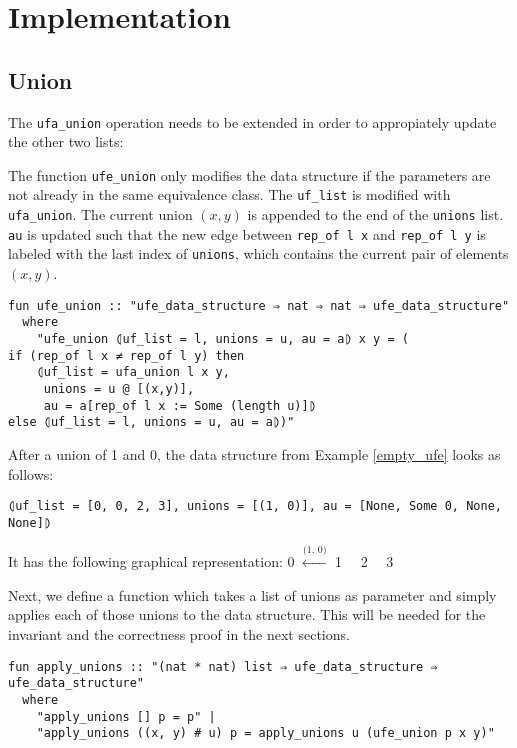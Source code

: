 \section{Implementation}

\subsection{Union}

The \lstinline{ufa_union} operation needs to be extended in order to appropiately update the other two lists:

The function \lstinline{ufe_union} only modifies the data structure if the parameters are not already in the same equivalence class.
The \lstinline{uf_list} is modified with \lstinline{ufa_union}.
The current union $(x, y)$ is appended to the end of the \lstinline{unions} list.
\lstinline{au} is updated such that the new edge between \lstinline{rep_of l x} and \lstinline{rep_of l y} is labeled with the last index of \lstinline{unions}, which contains the current pair of elements $(x, y)$.

\begin{lstlisting}
fun ufe_union :: "ufe_data_structure ⇒ nat ⇒ nat ⇒ ufe_data_structure"
  where
    "ufe_union ⦇uf_list = l, unions = u, au = a⦈ x y = (
if (rep_of l x ≠ rep_of l y) then
    ⦇uf_list = ufa_union l x y,
     unions = u @ [(x,y)],
     au = a[rep_of l x := Some (length u)]⦈
else ⦇uf_list = l, unions = u, au = a⦈)"
\end{lstlisting}

\begin{exmp}
After a union of 1 and 0, the data structure from Example \ref{empty_ufe} looks as follows:
\begin{lstlisting}
⦇uf_list = [0, 0, 2, 3], unions = [(1, 0)], au = [None, Some 0, None, None]⦈
\end{lstlisting}
It has the following graphical representation:
0 $\xleftarrow{\text{(1, 0)}}$ 1 \ \ 2 \ \ 3
\end{exmp}

Next, we define a function which takes a list of unions as parameter and simply applies each of those unions to the data structure. This will be needed for the invariant and the correctness proof in the next sections.

\begin{lstlisting}
fun apply_unions :: "(nat * nat) list ⇒ ufe_data_structure ⇒ ufe_data_structure"
  where
    "apply_unions [] p = p" |
    "apply_unions ((x, y) # u) p = apply_unions u (ufe_union p x y)"
\end{lstlisting}

